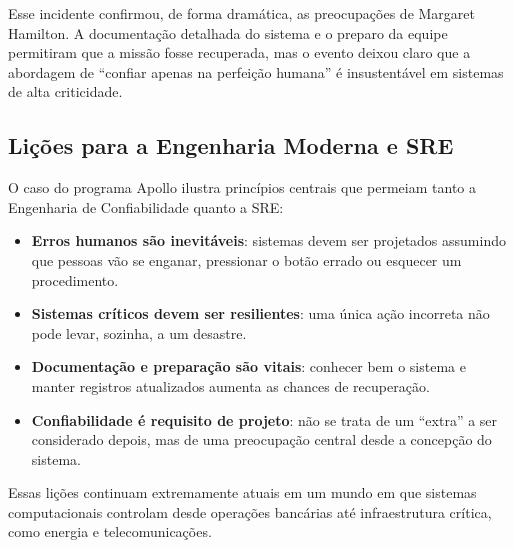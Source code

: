 \documentclass[12pt,a4paper]{report}
\begin{document}
Esse incidente confirmou, de forma dramática, as preocupações de Margaret
Hamilton. A documentação detalhada do sistema e o preparo da equipe
permitiram que a missão fosse recuperada, mas o evento deixou claro que a
abordagem de ``confiar apenas na perfeição humana'' é insustentável em
sistemas de alta criticidade.

\subsection{Lições para a Engenharia Moderna e SRE}

O caso do programa Apollo ilustra princípios centrais que permeiam tanto a
Engenharia de Confiabilidade quanto a SRE:
\begin{itemize}[nosep]
    \item \textbf{Erros humanos são inevitáveis}: sistemas devem ser projetados
    assumindo que pessoas vão se enganar, pressionar o botão errado ou esquecer
    um procedimento.
    \item \textbf{Sistemas críticos devem ser resilientes}: uma única ação
    incorreta não pode levar, sozinha, a um desastre.
    \item \textbf{Documentação e preparação são vitais}: conhecer bem o sistema
    e manter registros atualizados aumenta as chances de recuperação.
    \item \textbf{Confiabilidade é requisito de projeto}: não se trata de um
    ``extra'' a ser considerado depois, mas de uma preocupação central desde a
    concepção do sistema.
\end{itemize}

Essas lições continuam extremamente atuais em um mundo em que sistemas
computacionais controlam desde operações bancárias até infraestrutura
crítica, como energia e telecomunicações.
\end{document}
